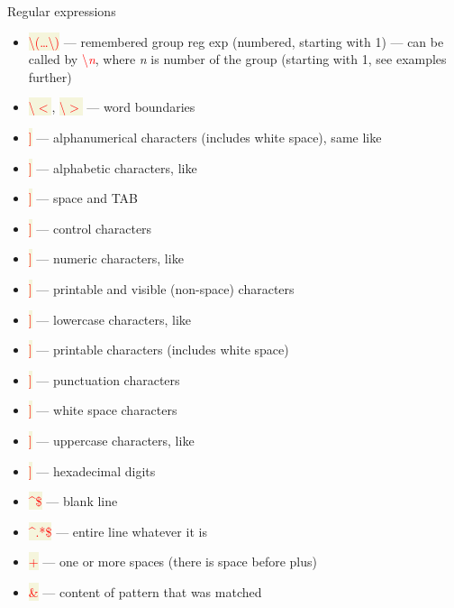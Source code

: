 \documentclass[compress, ucs, xelatex, 11pt, xcolor=svgnames, aspectratio=169,
	hyperref={
		bookmarks=true,
		unicode=true,
		colorlinks=true,
		pdftitle={Linux, command line and MetaCentrum},
		plainpages=false,
		pdfauthor={Vojtech Zeisek},
		pdfsubject={Course about use of Linux command line, writing shell scripts and using MetaCentrum of CESNET},
		pdfcreator={XeLaTeX},
		pdfkeywords={Linux, GNU, BASH, shell, command line, MetaCentrum},
		linkcolor=DarkRed, %
		anchorcolor=DarkBlue, %
		citecolor=Indigo, %
		filecolor=NavyBlue, %
		menucolor=DarkMagenta, %
		urlcolor=DarkBlue, %
		pdftex},
	url={hyphens, lowtilde} %
	]{beamer}
\renewcommand{\texttt}[1]{\colorbox{Beige}{{\ttfamily #1}}}
\renewcommand{\alert}[1]{\textcolor{red}{#1}}
\begin{document}
\begin{frame}[allowframebreaks]{Regular expressions}
\begin{itemize}
		\item \alert{\texttt{\textbackslash(\ldots\textbackslash)}} --- remembered group reg exp (numbered, starting with 1) --- can be called by \alert{\textbackslash\textit{n}}, where \textit{n} is number of the group (starting with 1, see examples further)
		\item \alert{\texttt{\textbackslash$<$}}, \alert{\texttt{\textbackslash$>$}} --- word boundaries
		\item \alert{\texttt{[[:alnum:]]}} --- alphanumerical characters (includes white space), same like \texttt{[a-zA-Z0-9]}
		\item \alert{\texttt{[[:alpha:]]}} --- alphabetic characters, like \texttt{[a-zA-Z]}
		\item \alert{\texttt{[[:blank:]]}} --- space and TAB
		\item \alert{\texttt{[[:cntrl:]]}} --- control characters
		\item \alert{\texttt{[[:digit:]]}} --- numeric characters, like \texttt{[0-9]}
		\item \alert{\texttt{[[:graph:]]}} --- printable and visible (non-space) characters
		\item \alert{\texttt{[[:lower:]]}} --- lowercase characters, like \texttt{[a-z]}
		\item \alert{\texttt{[[:print:]]}} --- printable characters (includes white space)
		\item \alert{\texttt{[[:punct:]]}} --- punctuation characters
		\item \alert{\texttt{[[:space:]]}} --- white space characters
		\item \alert{\texttt{[[:upper:]]}} --- uppercase characters, like \texttt{[A-Z]}
		\item \alert{\texttt{[[:xdigit:]]}} --- hexadecimal digits
		\item \alert{\texttt{\textasciicircum\$}} --- blank line
		\item \alert{\texttt{\textasciicircum.*\$}} --- entire line whatever it is
		\item \alert{\texttt{ +}} --- one or more spaces (there is space before plus)
		\item \alert{\texttt{\&}} --- content of pattern that was matched
	\end{itemize}
\end{frame}
\end{document}
